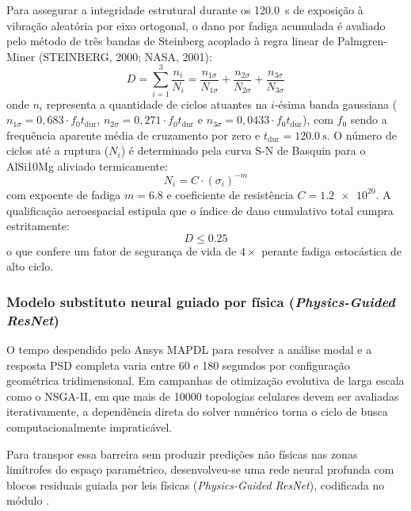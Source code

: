 Para assegurar a integridade estrutural durante os \SI{120.0}{\second} de exposição à vibração aleatória por eixo ortogonal, o dano por fadiga acumulada é avaliado pelo método de três bandas de Steinberg acoplado à regra linear de Palmgren-Miner (STEINBERG, 2000; NASA, 2001):
\begin{equation}
  D = \sum_{i=1}^{3} \frac{n_i}{N_i} = \frac{n_{1\sigma}}{N_{1\sigma}} + \frac{n_{2\sigma}}{N_{2\sigma}} + \frac{n_{3\sigma}}{N_{3\sigma}}
  \label{eq:miner}
\end{equation}
onde $n_i$ representa a quantidade de ciclos atuantes na $i$-ésima banda gaussiana ($n_{1\sigma} = 0{,}683 \cdot f_0 t_{\text{dur}}$, $n_{2\sigma} = 0{,}271 \cdot f_0 t_{\text{dur}}$ e $n_{3\sigma} = 0{,}0433 \cdot f_0 t_{\text{dur}}$), com $f_0$ sendo a frequência aparente média de cruzamento por zero e $t_{\text{dur}} = \SI{120.0}{\second}$. O número de ciclos até a ruptura ($N_i$) é determinado pela curva S-N de Basquin para o AlSi10Mg aliviado termicamente:
\begin{equation}
  N_i = C \cdot \left(\sigma_i\right)^{-m}
  \label{eq:basquin}
\end{equation}
com expoente de fadiga $m = \num{6.8}$ e coeficiente de resistência $C = \num{1.2e20}$. A qualificação aeroespacial estipula que o índice de dano cumulativo total cumpra estritamente:
\begin{equation}
  D \le \num{0.25}
  \label{eq:dmax}
\end{equation}
o que confere um fator de segurança de vida de $4\times$ perante fadiga estocástica de alto ciclo.

\subsubsection{Modelo substituto neural guiado por física (\textit{Physics-Guided ResNet})}
\label{subsubsec:resnet}

O tempo despendido pelo Ansys MAPDL para resolver a análise modal e a resposta PSD completa varia entre 60 e 180 segundos por configuração geométrica tridimensional. Em campanhas de otimização evolutiva de larga escala como o NSGA-II, em que mais de \num{10000} topologias celulares devem ser avaliadas iterativamente, a dependência direta do solver numérico torna o ciclo de busca computacionalmente impraticável.

Para transpor essa barreira sem produzir predições não físicas nas zonas limítrofes do espaço paramétrico, desenvolveu-se uma rede neural profunda com blocos residuais guiada por leis físicas (\textit{Physics-Guided ResNet}), codificada no módulo .

